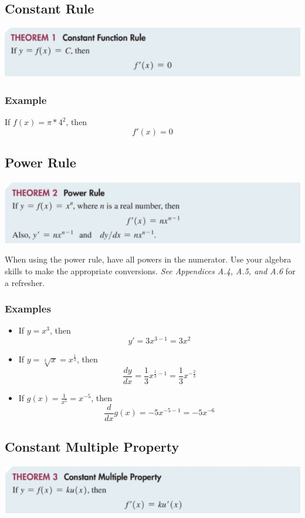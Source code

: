 \documentclass[14pt]{extarticle}
\begin{document}
\subsection{Constant Rule}
\begin{center}
	\includegraphics[width=0.9\linewidth]{9-5-2}
\end{center}
\subsubsection{Example}
If $f(x) = \pi * 4^2$, then
$$f'(x)= 0$$

\subsection{Power Rule}
\begin{center}
	\includegraphics[width=0.9\linewidth]{9-5-3}
\end{center}
When using the power rule, have all powers in the numerator. Use your algebra skills to make the appropriate conversions. \textit{See Appendices A.4, A.5, and A.6} for a refresher.
\subsubsection{Examples}
\begin{itemize}
	\item If $y = x^3$, then
	$$y' = 3x^{3-1} = 3x^2$$
	\item If $y = \sqrt[3]{x} = x^{\frac{1}{3}}$, then
	$$ \frac{dy}{dx}= \frac{1}{3}x^{\frac{1}{3}-1}= \frac{1}{3}x^{-\frac{2}{3}}$$
	\item If $g(x) = \frac{1}{x^5} = x^{-5}$, then
	$$ \frac{d}{dx}g(x) = -5x^{-5-1} = -5x^{-6}$$
\end{itemize}

\subsection{Constant Multiple Property}
\begin{center}
	\includegraphics[width=0.9\linewidth]{9-5-4}
\end{center}
\end{document}
